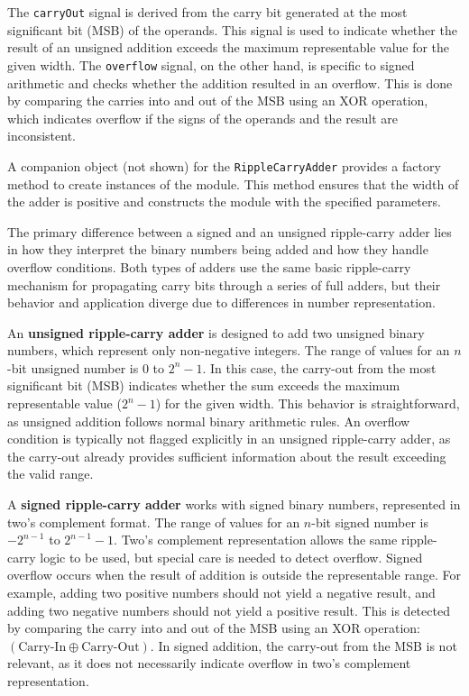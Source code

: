 {The \texttt{carryOut} signal is derived from the carry bit generated at the most significant bit (MSB) of the operands. This signal is used to indicate whether the result of an unsigned addition exceeds the maximum representable value for the given width. The \texttt{overflow} signal, on the other hand, is specific to signed arithmetic and checks whether the addition resulted in an overflow. This is done by comparing the carries into and out of the MSB using an XOR operation, which indicates overflow if the signs of the operands and the result are inconsistent.

A companion object (not shown) for the \texttt{RippleCarryAdder} provides a factory method to create instances of the module. This method ensures that the width of the adder is positive and constructs the module with the specified parameters. 

The primary difference between a signed and an unsigned ripple-carry adder lies in how they interpret the binary numbers being added and how they handle overflow conditions. Both types of adders use the same basic ripple-carry mechanism for propagating carry bits through a series of full adders, but their behavior and application diverge due to differences in number representation.

An \textbf{unsigned ripple-carry adder} is designed to add two unsigned binary numbers, which represent only non-negative integers. The range of values for an \( n \)-bit unsigned number is \( 0 \) to \( 2^n - 1 \). In this case, the carry-out from the most significant bit (MSB) indicates whether the sum exceeds the maximum representable value (\( 2^n - 1 \)) for the given width. This behavior is straightforward, as unsigned addition follows normal binary arithmetic rules. An overflow condition is typically not flagged explicitly in an unsigned ripple-carry adder, as the carry-out already provides sufficient information about the result exceeding the valid range.

A \textbf{signed ripple-carry adder} works with signed binary numbers, represented in two's complement format. The range of values for an \( n \)-bit signed number is \( -2^{n-1} \) to \( 2^{n-1} - 1 \). Two's complement representation allows the same ripple-carry logic to be used, but special care is needed to detect overflow. Signed overflow occurs when the result of addition is outside the representable range. For example, adding two positive numbers should not yield a negative result, and adding two negative numbers should not yield a positive result. This is detected by comparing the carry into and out of the MSB using an XOR operation: \((\text{Carry-In} \oplus \text{Carry-Out})\). In signed addition, the carry-out from the MSB is not relevant, as it does not necessarily indicate overflow in two's complement representation.

}
